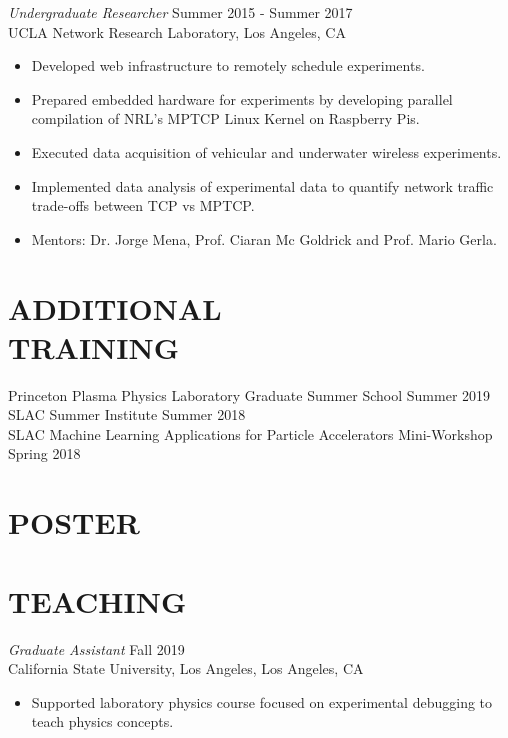 \documentclass[margin,line]{res}
\let\origsection\section%
\let\section\subsection%
\let\section\origsection%
\begin{document}
\begin{resume}
{\sl Undergraduate Researcher} \hfill Summer 2015 - Summer 2017 \\
                UCLA Network Research Laboratory, 
                Los Angeles, CA 
                 \begin{itemize}  \itemsep -2pt %
                 \item Developed web infrastructure to remotely schedule experiments.
                \item Prepared embedded hardware for experiments by developing parallel compilation of NRL's MPTCP Linux Kernel on Raspberry Pis.
                \item Executed data acquisition of vehicular and underwater wireless experiments.
                \item Implemented data analysis of experimental data to quantify network traffic trade-offs between TCP vs MPTCP.
                \item Mentors: Dr. Jorge Mena, Prof. Ciaran Mc Goldrick and Prof. Mario Gerla.
                \end{itemize}  
                
\section{\mysidestyle  ADDITIONAL \\ TRAINING}
 
{ Princeton Plasma Physics Laboratory
Graduate Summer School }\hfill  Summer 2019\\
{SLAC Summer Institute }\hfill  Summer 2018 \\
 { 
SLAC Machine Learning Applications for Particle Accelerators Mini-Workshop} \hfill            Spring 2018 \\        

\section{\mysidestyle  POSTER}
\printbibliography[heading=none, type=misc]     

\section{\mysidestyle  TEACHING}  

{\sl Graduate Assistant} \hfill Fall 2019 \\
California State University, Los Angeles, Los Angeles, CA
\begin{itemize} \itemsep -2pt 
\item Supported laboratory physics course focused on experimental debugging to teach physics concepts.
\end{itemize}


\end{resume}
\end{document}

